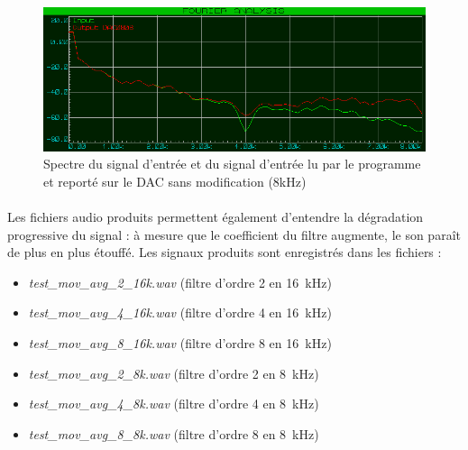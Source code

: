 \documentclass{article}
\begin{document}
    \begin{figure}[H]
        \centering
        \includegraphics[width=.6\textwidth]{./images/spectrum_no_filter_8k.png}
        \caption{Spectre du signal d'entrée et du signal d'entrée lu par le programme et reporté sur le DAC sans modification (8kHz)}
    \end{figure}

    \paragraph{}
    Les fichiers audio produits permettent également d'entendre la dégradation progressive du signal : à mesure que le coefficient du filtre augmente, le son paraît de plus en plus étouffé. Les signaux produits sont enregistrés dans les fichiers :
    \begin{itemize}
        \item \emph{test\_mov\_avg\_2\_16k.wav} (filtre d'ordre 2 en \SI{16}{\kilo\hertz})
        \item \emph{test\_mov\_avg\_4\_16k.wav} (filtre d'ordre 4 en \SI{16}{\kilo\hertz})
        \item \emph{test\_mov\_avg\_8\_16k.wav} (filtre d'ordre 8 en \SI{16}{\kilo\hertz})
        \item \emph{test\_mov\_avg\_2\_8k.wav} (filtre d'ordre 2 en \SI{8}{\kilo\hertz})
        \item \emph{test\_mov\_avg\_4\_8k.wav} (filtre d'ordre 4 en \SI{8}{\kilo\hertz})
        \item \emph{test\_mov\_avg\_8\_8k.wav} (filtre d'ordre 8 en \SI{8}{\kilo\hertz})
    \end{itemize}
\end{document}
